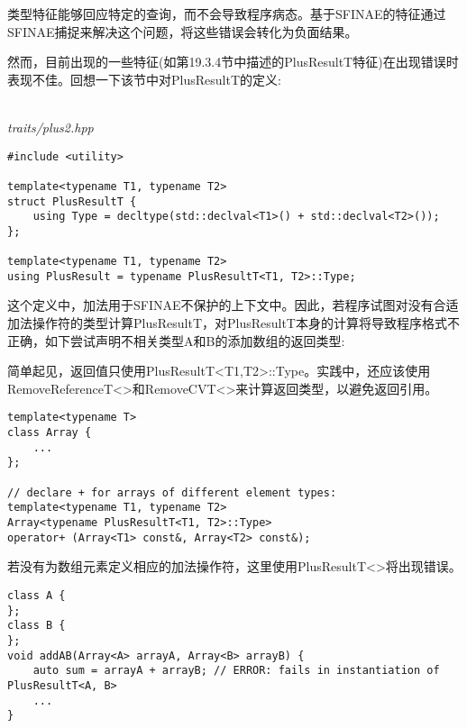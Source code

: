 
类型特征能够回应特定的查询，而不会导致程序病态。基于SFINAE的特征通过SFINAE捕捉来解决这个问题，将这些错误会转化为负面结果。

然而，目前出现的一些特征(如第19.3.4节中描述的PlusResultT特征)在出现错误时表现不佳。回想一下该节中对PlusResultT的定义:

\hspace*{\fill} \\ %
\noindent
\textit{traits/plus2.hpp}
\begin{lstlisting}[style=styleCXX]
#include <utility>

template<typename T1, typename T2>
struct PlusResultT {
	using Type = decltype(std::declval<T1>() + std::declval<T2>());
};

template<typename T1, typename T2>
using PlusResult = typename PlusResultT<T1, T2>::Type;
\end{lstlisting}

这个定义中，加法用于SFINAE不保护的上下文中。因此，若程序试图对没有合适加法操作符的类型计算PlusResultT，对PlusResultT本身的计算将导致程序格式不正确，如下尝试声明不相关类型A和B的添加数组的返回类型:

\begin{tcolorbox}[colback=webgreen!5!white,colframe=webgreen!75!black]
\hspace*{0.75cm}简单起见，返回值只使用PlusResultT<T1,T2>::Type。实践中，还应该使用RemoveReferenceT<>和RemoveCVT<>来计算返回类型，以避免返回引用。
\end{tcolorbox}

\begin{lstlisting}[style=styleCXX]
template<typename T>
class Array {
	...
};

// declare + for arrays of different element types:
template<typename T1, typename T2>
Array<typename PlusResultT<T1, T2>::Type>
operator+ (Array<T1> const&, Array<T2> const&);
\end{lstlisting}

若没有为数组元素定义相应的加法操作符，这里使用PlusResultT<>将出现错误。

\begin{lstlisting}[style=styleCXX]
class A {
};
class B {
};
void addAB(Array<A> arrayA, Array<B> arrayB) {
	auto sum = arrayA + arrayB; // ERROR: fails in instantiation of PlusResultT<A, B>
	...
}
\end{lstlisting}

